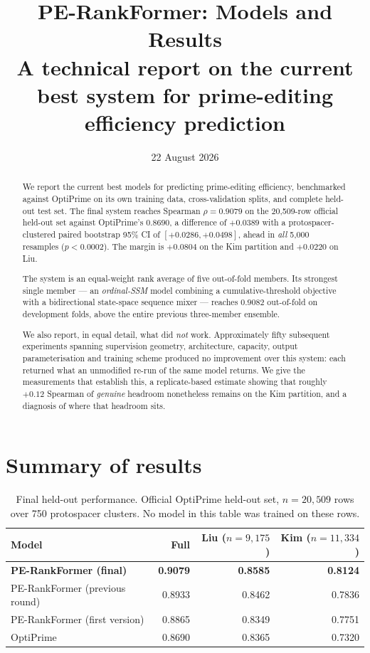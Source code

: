 \documentclass[11pt]{article}
\title{\textbf{PE-RankFormer: Models and Results}\\[0.4em]
\large A technical report on the current best system for prime-editing efficiency prediction}
\author{}
\date{22 August 2026}
\begin{document}
\maketitle

\begin{abstract}
\noindent
We report the current best models for predicting prime-editing efficiency, benchmarked
against OptiPrime on its own training data, cross-validation splits, and complete
held-out test set. The final system reaches Spearman $\rho = \mathbf{0.9079}$ on the
20{,}509-row official held-out set against OptiPrime's $0.8690$, a difference of
$\mathbf{+0.0389}$ with a protospacer-clustered paired bootstrap 95\% CI of
$[+0.0286, +0.0498]$, ahead in \emph{all} 5{,}000 resamples ($p < 0.0002$). The margin
is $+0.0804$ on the Kim partition and $+0.0220$ on Liu.

The system is an equal-weight rank average of five out-of-fold members. Its strongest
single member --- an \emph{ordinal-SSM} model combining a cumulative-threshold
objective with a bidirectional state-space sequence mixer --- reaches $0.9082$
out-of-fold on development folds, above the entire previous three-member ensemble.

We also report, in equal detail, what did \emph{not} work. Approximately fifty
subsequent experiments spanning supervision geometry, architecture, capacity, output
parameterisation and training scheme produced no improvement over this system: each
returned what an unmodified re-run of the same model returns. We give the measurements
that establish this, a replicate-based estimate showing that roughly $+0.12$ Spearman
of \emph{genuine} headroom nonetheless remains on the Kim partition, and a diagnosis of
where that headroom sits.
\end{abstract}

\tableofcontents

\section{Summary of results}

\begin{table}[H]
\centering
\caption{Final held-out performance. Official OptiPrime held-out set, $n=20{,}509$
rows over 750 protospacer clusters. No model in this table was trained on these rows.}
\label{tab:headline}
\begin{tabular}{lrrr}
\toprule
Model & Full & Liu ($n{=}9{,}175$) & Kim ($n{=}11{,}334$) \\
\midrule
\textbf{PE-RankFormer (final)} & \textbf{0.9079} & \textbf{0.8585} & \textbf{0.8124} \\
PE-RankFormer (previous round) & 0.8933 & 0.8462 & 0.7836 \\
PE-RankFormer (first version) & 0.8865 & 0.8349 & 0.7751 \\
OptiPrime & 0.8690 & 0.8365 & 0.7320 \\
\bottomrule
\end{tabular}
\end{table}
\end{document}
